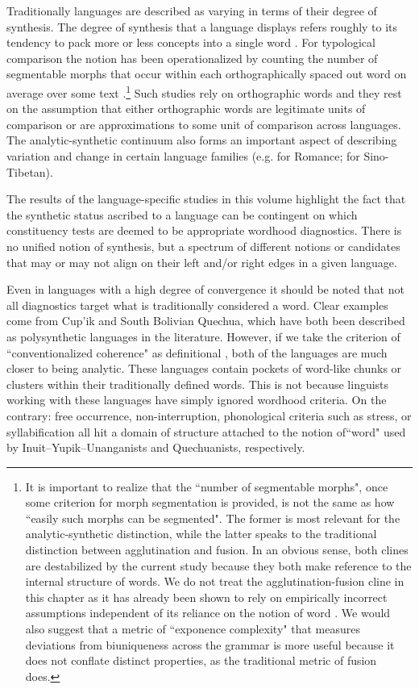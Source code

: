 \documentclass[output=paper,draftmode]{langscibook}
\begin{document}
Traditionally languages are described as varying in terms of their degree of synthesis. The degree of synthesis that a language displays refers roughly to its tendency to pack more or less concepts into a single word \citep{Sapir1921}. For typological comparison the notion has been operationalized by counting the number of segmentable morphs that occur within each orthographically spaced out word on average over some text \citep{greenberg1954quantitative, easterday2021syllable}.\footnote{It is important to realize that the ``number of segmentable morphs", once some criterion for morph segmentation is provided, is not the same as how ``easily such morphs can be segmented". The former is most relevant for the analytic-synthetic distinction, while the latter speaks to the traditional distinction between agglutination and fusion. In an obvious sense, both clines are destabilized by the current study because they both make reference to the internal structure of words. We do not treat the agglutination-fusion cline in this chapter as it has already been shown to rely on empirically incorrect assumptions independent of its reliance on the notion of word \citet{haspelmath2009agglutinating}. We would also suggest that a metric of ``exponence complexity" \citep{tallman2023measuring} that measures deviations from biuniqueness across the grammar is more useful because it does not conflate distinct properties, as the traditional metric of fusion does.} Such studies rely on orthographic words and they rest on the assumption that either orthographic words are legitimate units of comparison or are approximations to some unit of comparison across languages. 
The analytic-synthetic continuum also forms an important aspect of describing variation and change in certain language families (e.g. \citealt{schwegler1990analyticity, ledgeway2017syntheticity} for Romance; \citealt{arcodia2020morphology} for Sino-Tibetan).

The results of the language-specific studies in this volume highlight the fact that the synthetic status ascribed to a language can be contingent on which constituency tests are deemed to be appropriate wordhood diagnostics. There is no unified notion of synthesis, but a spectrum of different notions or candidates that may or may not align on their left and/or right edges in a given language.

Even in languages with a high degree of convergence it should be noted that not all diagnostics target what is traditionally considered a word. Clear examples come from Cup'ik and South Bolivian Quechua, which have both been described as polysynthetic languages in the literature. However, if we take the criterion of ``conventionalized coherence" as definitional \citep{dixonaikhenvald02, dixon2010basica, aikhenvald2020essence}, both of the languages are much closer to being analytic. These languages contain pockets of word-like chunks or clusters within their traditionally defined words. This is not because linguists working with these languages have simply ignored wordhood criteria. On the contrary: free occurrence, non-interruption, phonological criteria such as stress, or syllabification all hit a domain of structure attached to the notion of``word" used by  Inuit–Yupik–Unanganists and Quechuanists, respectively.
\end{document}
